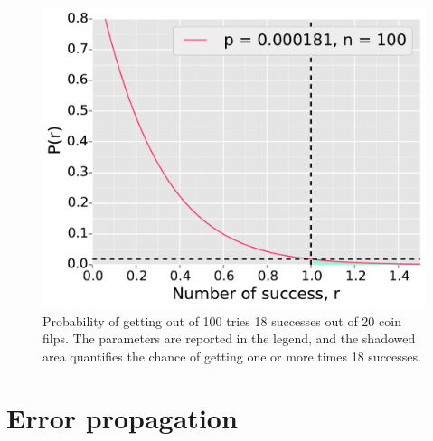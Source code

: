 \documentclass[twocolumn]{article}
\begin{document}
	\begin{figure}[h]
		\begin{center}
			\includegraphics[width=.4\textwidth]{fig/lil_2.pdf}
		\end{center}
		\caption{Probability of getting out of 100 tries 18 successes out of 20 coin filps. The parameters are reported in the legend, and the shadowed area quantifies the chance of getting one or more times 18 successes.}
		\label{fig:lil2}
	\end{figure}
\section{Error propagation} %
\label{sec:error_propagation}
\end{document}
